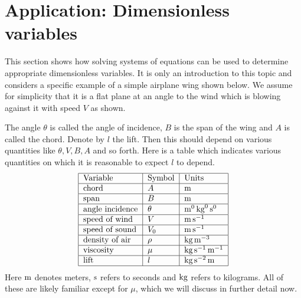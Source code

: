 \section{Application: Dimensionless variables}

This section shows how solving systems of equations can be used to
determine appropriate dimensionless variables. It is only an
introduction to this topic and considers a specific example of a
simple airplane wing shown below. We assume for simplicity that it is a flat plane at an angle to the wind which is blowing against it
with speed $V$ as shown.

\begin{center}
\end{center}

The angle $\theta$ is called the angle of incidence, $B$ is the span of the wing and $A$ is called the chord. Denote by $l$ the lift. Then this should depend on
various quantities like $\theta ,V,B,A$ and so forth. Here is a table which
indicates various quantities on which it is reasonable to expect $l$ to
depend. 
\begin{equation*}
\begin{tabular}{|l|l|l|}
\hline
Variable & Symbol & Units \\ \hline
chord & $A$ & $\m$ \\ \hline
span & $B$ & $\m$ \\ \hline
angle incidence & $\theta $ & $\m^{0}\kg^{0}\s ^{0}$ \\ \hline
speed of wind & $V$ & $\m\s ^{-1}$ \\ \hline
speed of sound & $V_{0}$ & $\m\s ^{-1}$ \\ \hline
density of air & $\rho $ & $\kg\m^{-3}$ \\ \hline
viscosity & $\mu $ & $\kg\s ^{-1}\m^{-1}$ \\ \hline
lift & $l$ & $\kg\s ^{-2}\m$ \\ \hline
\end{tabular}
\end{equation*}
Here $\mathop{\textrm{\rm m}}\nolimits$ denotes meters, $\mathop{\textrm{\rm s}}\nolimits $ refers to seconds and $\mathop{\textrm{\rm kg}}\nolimits$ refers to
kilograms. All of these are likely familiar except for $\mu $, which we will discuss in further detail now. 

